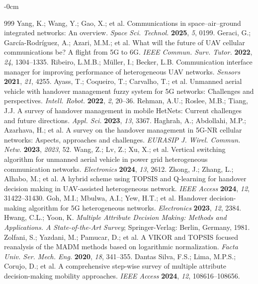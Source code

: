 \begin{adjustwidth}{-\extralength}{0cm}


\begin{thebibliography}{999}
Yang, K.; Wang, Y.; Gao, X.; et al. Communications in space--air--ground integrated networks: An overview. {\em Space Sci. Technol.} {\bf 2025}, {\em 5}, 0199.
Geraci, G.; García-Rodríguez, A.; Azari, M.M.; et al. What will the future of UAV cellular communications be? A flight from 5G to 6G. {\em IEEE Commun. Surv. Tutor.} {\bf 2022}, {\em 24}, 1304--1335.
Ribeiro, L.M.B.; Müller, I.; Becker, L.B. Communication interface manager for improving performance of heterogeneous UAV networks. {\em Sensors} {\bf 2021}, {\em 21}, 4255.
Ayass, T.; Coqueiro, T.; Carvalho, T.; et al. Unmanned aerial vehicle with handover management fuzzy system for 5G networks: Challenges and perspectives. {\em Intell. Robot.} {\bf 2022}, {\em 2}, 20--36.
Rehman, A.U.; Roslee, M.B.; Tiang, J.J. A survey of handover management in mobile HetNets: Current challenges and future directions. {\em Appl. Sci.} {\bf 2023}, {\em 13}, 3367.
Haghrah, A.; Abdollahi, M.P.; Azarhava, H.; et al. A survey on the handover management in 5G-NR cellular networks: Aspects, approaches and challenges. {\em EURASIP J. Wirel. Commun. Netw.} {\bf 2023}, {\em 2023}, 52.
Wang, Z.; Lv, Z.; Xu, X.; et al. Vertical switching algorithm for unmanned aerial vehicle in power grid heterogeneous communication networks. {\em Electronics} {\bf 2024}, {\em 13}, 2612.
Zhong, J.; Zhang, L.; Alhabo, M.; et al. A hybrid scheme using TOPSIS and Q-learning for handover decision making in UAV-assisted heterogeneous network. {\em IEEE Access} {\bf 2024}, {\em 12}, 31422--31430.
Goh, M.I.; Mbulwa, A.I.; Yew, H.T.; et al. Handover decision-making algorithm for 5G heterogeneous networks. {\em Electronics} {\bf 2023}, {\em 12}, 2384.
Hwang, C.L.; Yoon, K. \textit{Multiple Attribute Decision Making: Methods and Applications. A State-of-the-Art Survey}; Springer-Verlag: Berlin, Germany, 1981.
Zolfani, S.; Yazdani, M.; Pamucar, D.; et al. A VIKOR and TOPSIS focused reanalysis of the MADM methods based on logarithmic normalization. {\em Facta Univ. Ser. Mech. Eng.} {\bf 2020}, {\em 18}, 341--355.
Dantas Silva, F.S.; Lima, M.P.S.; Corujo, D.; et al. A comprehensive step-wise survey of multiple attribute decision-making mobility approaches. {\em IEEE Access} {\bf 2024}, {\em 12}, 108616--108656.

\end{thebibliography}
\end{adjustwidth}

